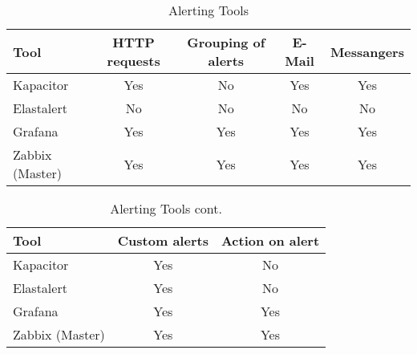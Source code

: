 \begin{table}
	\centering
	
	\label{tab:alerting}
	\begin{tabular}{lcccc}
		\hline
Tool & HTTP requests & Grouping of alerts         & E-Mail                      & Messangers \\
\hline
Kapacitor                    & Yes           & No & Yes                         & Yes \\
Elastalert & No & No & No & No \\
Grafana                      & Yes           & Yes                        & Yes & Yes \\
Zabbix (Master)              & Yes           & Yes                        & Yes                         & Yes \\
		\hline
	\end{tabular}
	\caption{Alerting Tools}
\end{table}

\begin{table}
	\centering
	
	\label{tab:alertingcont}
	\begin{tabular}{lcc}
		\hline
		Tool & Custom alerts & Action on alert \\
		\hline
		Kapacitor                    & Yes           & No              \\
		Elastalert                   & Yes           & No              \\
		Grafana                      & Yes           & Yes             \\
		Zabbix (Master)              & Yes           & Yes           \\
		\hline 
	\end{tabular}
	\caption{Alerting Tools cont.}
\end{table}